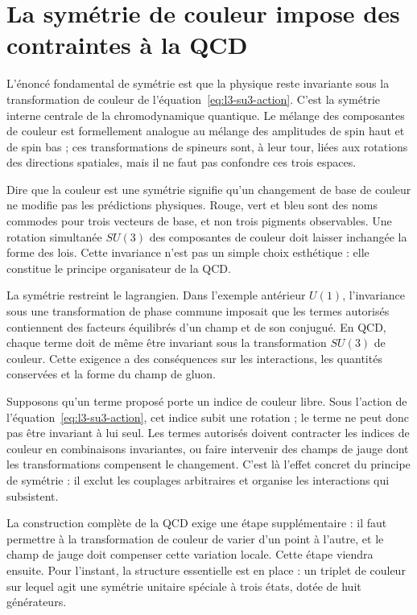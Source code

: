 \section{La symétrie de couleur impose des contraintes à la QCD}

L’énoncé fondamental de symétrie est que la physique reste invariante sous la transformation de couleur de l’équation~\eqref{eq:l3-su3-action}. C’est la symétrie interne centrale de la chromodynamique quantique. Le mélange des composantes de couleur est formellement analogue au mélange des amplitudes de spin haut et de spin bas ; ces transformations de spineurs sont, à leur tour, liées aux rotations des directions spatiales, mais il ne faut pas confondre ces trois espaces.

Dire que la couleur est une symétrie signifie qu’un changement de base de couleur ne modifie pas les prédictions physiques. Rouge, vert et bleu sont des noms commodes pour trois vecteurs de base, et non trois pigments observables. Une rotation simultanée \(SU(3)\) des composantes de couleur doit laisser inchangée la forme des lois. Cette invariance n’est pas un simple choix esthétique : elle constitue le principe organisateur de la QCD.

La symétrie restreint le lagrangien. Dans l’exemple antérieur \(U(1)\), l’invariance sous une transformation de phase commune imposait que les termes autorisés contiennent des facteurs équilibrés d’un champ et de son conjugué. En QCD, chaque terme doit de même être invariant sous la transformation \(SU(3)\) de couleur. Cette exigence a des conséquences sur les interactions, les quantités conservées et la forme du champ de gluon.

Supposons qu’un terme proposé porte un indice de couleur libre. Sous l’action de l’équation~\eqref{eq:l3-su3-action}, cet indice subit une rotation ; le terme ne peut donc pas être invariant à lui seul. Les termes autorisés doivent contracter les indices de couleur en combinaisons invariantes, ou faire intervenir des champs de jauge dont les transformations compensent le changement. C’est là l’effet concret du principe de symétrie : il exclut les couplages arbitraires et organise les interactions qui subsistent.

La construction complète de la QCD exige une étape supplémentaire : il faut permettre à la transformation de couleur de varier d’un point à l’autre, et le champ de jauge doit compenser cette variation locale. Cette étape viendra ensuite. Pour l’instant, la structure essentielle est en place : un triplet de couleur sur lequel agit une symétrie unitaire spéciale à trois états, dotée de huit générateurs.

